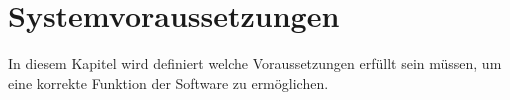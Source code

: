 \section{Systemvoraussetzungen}
In diesem Kapitel wird definiert welche Voraussetzungen erfüllt sein müssen, um eine korrekte Funktion der Software zu ermöglichen.